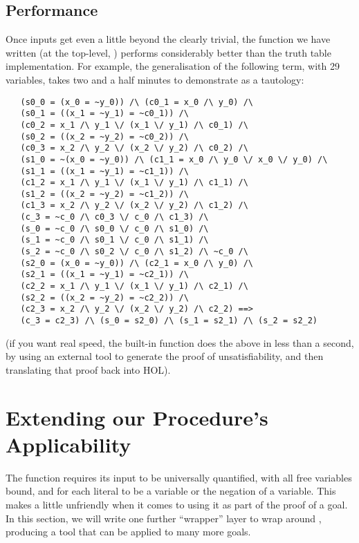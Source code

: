 \subsection{Performance}
\label{sec:dpll-performance}

Once inputs get even a little beyond the clearly trivial, the function
we have written (at the top-level, ) performs considerably
better than the truth table implementation.  For example, the
generalisation of the following term, with 29 variables, takes
 two and a half minutes to demonstrate as a tautology:
\begin{hol}
\begin{verbatim}
   (s0_0 = (x_0 = ~y_0)) /\ (c0_1 = x_0 /\ y_0) /\
   (s0_1 = ((x_1 = ~y_1) = ~c0_1)) /\
   (c0_2 = x_1 /\ y_1 \/ (x_1 \/ y_1) /\ c0_1) /\
   (s0_2 = ((x_2 = ~y_2) = ~c0_2)) /\
   (c0_3 = x_2 /\ y_2 \/ (x_2 \/ y_2) /\ c0_2) /\
   (s1_0 = ~(x_0 = ~y_0)) /\ (c1_1 = x_0 /\ y_0 \/ x_0 \/ y_0) /\
   (s1_1 = ((x_1 = ~y_1) = ~c1_1)) /\
   (c1_2 = x_1 /\ y_1 \/ (x_1 \/ y_1) /\ c1_1) /\
   (s1_2 = ((x_2 = ~y_2) = ~c1_2)) /\
   (c1_3 = x_2 /\ y_2 \/ (x_2 \/ y_2) /\ c1_2) /\
   (c_3 = ~c_0 /\ c0_3 \/ c_0 /\ c1_3) /\
   (s_0 = ~c_0 /\ s0_0 \/ c_0 /\ s1_0) /\
   (s_1 = ~c_0 /\ s0_1 \/ c_0 /\ s1_1) /\
   (s_2 = ~c_0 /\ s0_2 \/ c_0 /\ s1_2) /\ ~c_0 /\
   (s2_0 = (x_0 = ~y_0)) /\ (c2_1 = x_0 /\ y_0) /\
   (s2_1 = ((x_1 = ~y_1) = ~c2_1)) /\
   (c2_2 = x_1 /\ y_1 \/ (x_1 \/ y_1) /\ c2_1) /\
   (s2_2 = ((x_2 = ~y_2) = ~c2_2)) /\
   (c2_3 = x_2 /\ y_2 \/ (x_2 \/ y_2) /\ c2_2) ==>
   (c_3 = c2_3) /\ (s_0 = s2_0) /\ (s_1 = s2_1) /\ (s_2 = s2_2)
\end{verbatim}
\end{hol}
(if you want real speed, the built-in function  does the above 
in less than a second, by using  an external tool to generate the proof
 of unsatisfiability, and then translating that proof back into HOL).

\section{Extending our Procedure's Applicability}
\label{sec:dpll-applicability-extension}

The function  requires its input to be universally
quantified, with all free variables bound, and for each literal to be
a variable or the negation of a variable.  This makes \ml{DPLL\_UNIV}
a little unfriendly when it comes to using it as part of the proof of
a goal.  In this section, we will write one further ``wrapper''
layer to wrap around \ml{DPLL\_UNIV}, producing a tool that can be
applied to many more goals.

